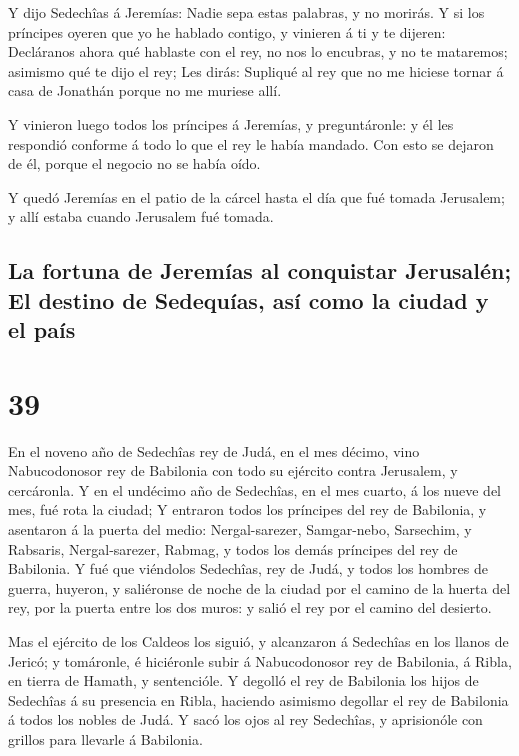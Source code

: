  Y dijo Sedechîas á Jeremías: Nadie sepa estas palabras,
y no morirás.  Y si los príncipes oyeren que yo he
hablado contigo, y vinieren á ti y te dijeren: Decláranos ahora qué
hablaste con el rey, no nos lo encubras, y no te mataremos; asimismo qué
te dijo el rey;  Les dirás: Supliqué al rey que no me
hiciese tornar á casa de Jonathán porque no me muriese allí.

 Y vinieron luego todos los príncipes á Jeremías, y
preguntáronle: y él les respondió conforme á todo lo que el rey le había
mandado. Con esto se dejaron de él, porque el negocio no se había oído.

 Y quedó Jeremías en el patio de la cárcel hasta el día
que fué tomada Jerusalem; y allí estaba cuando Jerusalem fué tomada.

\hypertarget{la-fortuna-de-jeremuxedas-al-conquistar-jerusaluxe9n-el-destino-de-sedequuxedas-asuxed-como-la-ciudad-y-el-pauxeds}{%
\subsection{La fortuna de Jeremías al conquistar Jerusalén; El destino
de Sedequías, así como la ciudad y el
país}\label{la-fortuna-de-jeremuxedas-al-conquistar-jerusaluxe9n-el-destino-de-sedequuxedas-asuxed-como-la-ciudad-y-el-pauxeds}}

\hypertarget{section-38}{%
\section{39}\label{section-38}}

 En el noveno año de Sedechîas rey de Judá, en el mes
décimo, vino Nabucodonosor rey de Babilonia con todo su ejército contra
Jerusalem, y cercáronla.  Y en el undécimo año de
Sedechîas, en el mes cuarto, á los nueve del mes, fué rota la ciudad;
 Y entraron todos los príncipes del rey de Babilonia, y
asentaron á la puerta del medio: Nergal-sarezer, Samgar-nebo, Sarsechim,
y Rabsaris, Nergal-sarezer, Rabmag, y todos los demás príncipes del rey
de Babilonia.  Y fué que viéndolos Sedechîas, rey de Judá,
y todos los hombres de guerra, huyeron, y saliéronse de noche de la
ciudad por el camino de la huerta del rey, por la puerta entre los dos
muros: y salió el rey por el camino del desierto.

 Mas el ejército de los Caldeos los siguió, y alcanzaron á
Sedechîas en los llanos de Jericó; y tomáronle, é hiciéronle subir á
Nabucodonosor rey de Babilonia, á Ribla, en tierra de Hamath, y
sentencióle.  Y degolló el rey de Babilonia los hijos de
Sedechîas á su presencia en Ribla, haciendo asimismo degollar el rey de
Babilonia á todos los nobles de Judá.  Y sacó los ojos al
rey Sedechîas, y aprisionóle con grillos para llevarle á Babilonia.

